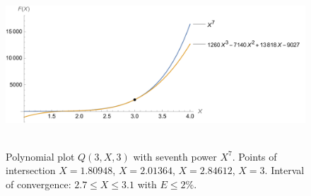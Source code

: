 ﻿\begin{figure}[H]
    \centering
    \includegraphics[width=1\textwidth]{sections/images/06_plots_polynomial_q3_n3_with_seventh}
    ~\caption{Polynomial plot $Q(3, X, 3)$ with seventh power $X^7$.
    Points of intersection $X=1.80948$, $X=2.01364$, $X=2.84612$, $X=3$.
    Interval of convergence: $2.7 \leq X \leq 3.1$ with $E \leq 2\%$.
    }\label{fig:figure12}
\end{figure}
